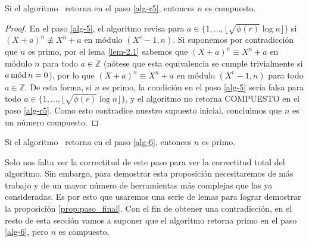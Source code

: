 	\begin{proposition}
		Si el algoritmo \AKS\ retorna en el paso \ref{alg-r5}, entonces $n$ es compuesto.
	\end{proposition}
	\begin{proof}
	En el paso \ref{alg-5}, el algoritmo revisa para $a\in \{1, \ldots, \lfloor \sqrt{\phi(r)} \log n\rfloor\}$ si $(X+a)^n \not\equiv X^n+a$ en módulo $(X^r-1,n)$. Si suponemos por contradicción que $n$ es primo, por el lema \ref{lem-2.1} sabemos que $(X+a)^n \equiv X^n+a$ en módulo $n$ para todo $a \in \mathbb{Z}$ (nótese que esta equivalencia se cumple trivialmente si $a\mods n = 0$), por lo que $(X+a)^n \equiv X^n+a$ en módulo $(X^r-1,n)$ para todo $a \in \mathbb{Z}$. De esta forma, si $n$ es primo, la condición en el paso \ref{alg-5} sería falsa para todo  $a\in \{1, \ldots, \lfloor \sqrt{\phi(r)} \log n\rfloor\}$, y el algoritmo no retorna COMPUESTO en el paso \ref{alg-r5}. Como esto contradice nuestro supuesto inicial, concluimos que $n$ es un número compuesto.
	\end{proof}
	
	\begin{proposition}\label{prop:paso_final}
		Si el algoritmo \AKS\ retorna en el paso \ref{alg-6}, entonces $n$ es primo.
	\end{proposition}
	Solo nos falta ver la correctitud de este paso para ver la correctitud total del algoritmo.
	Sin embargo, para demostrar esta proposición necesitaremos de más trabajo y de un mayor número de herramientas más complejas que las ya consideradas.
	Es por esto que usaremos una serie de lemas
        para lograr demostrar la proposición \ref{prop:paso_final}.
	Con el fin de obtener una contradicción, en el resto de esta sección vamos a suponer 	
	que el algoritmo retorna primo en el paso \ref{alg-6}, pero $n$ es compuesto.	
	

